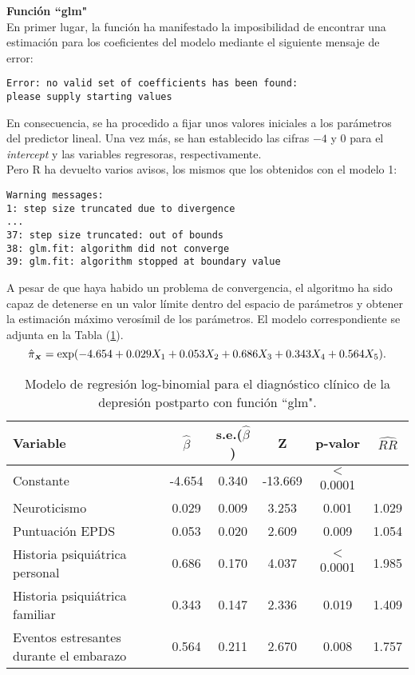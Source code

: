 \textbf{Función ``glm"}\\
[0.3cm]
En primer lugar, la función ha manifestado la imposibilidad de encontrar una estimación para los coeficientes del modelo mediante el siguiente mensaje de error:
\begin{Verbatim}[formatcom=\color{Red},  xleftmargin=2.2cm]
Error: no valid set of coefficients has been found: 
please supply starting values
\end{Verbatim}

En consecuencia, se ha procedido a fijar unos valores iniciales a los parámetros del predictor lineal. Una vez más, se han establecido las cifras $-4$ y $0$ para el \textit{intercept} y las variables regresoras, respectivamente.\\

Pero R ha devuelto varios avisos, los mismos que los obtenidos con el modelo 1:
\begin{Verbatim}[xleftmargin=2.5cm]
Warning messages:
1: step size truncated due to divergence
...
37: step size truncated: out of bounds
38: glm.fit: algorithm did not converge
39: glm.fit: algorithm stopped at boundary value
\end{Verbatim}

A pesar de que haya habido un problema de convergencia, el algoritmo ha sido capaz de detenerse en un valor límite dentro del espacio de parámetros y obtener la estimación máximo verosímil de los parámetros. El modelo correspondiente se adjunta en la Tabla (\ref{tab:15}).
\begin{equation*}
\hat{\pi}_{\mathsmaller{\boldsymbol{X}}}=\exp(-4.654+0.029X_1+0.053X_2+0.686X_3+0.343X_4+0.564X_5).
\end{equation*}

\begin{table} [H]
	\centering
	\begin{tabular}{l c c c c c}
		\toprule
		\textbf{Variable} & $\hat{\beta}$ & s.e.($\hat{\beta}$) & Z & p-valor &$\widehat{RR}$\\
		\midrule
		Constante &   -4.654&  0.340 &-13.669 & $<$ 0.0001  &  \\
		Neuroticismo &  0.029 &  0.009 & 3.253 & 0.001 & 1.029\\
		Puntuación EPDS &  0.053 & 0.020 &  2.609  &0.009& 1.054 \\
		Historia psiquiátrica personal &   0.686  & 0.170&  4.037 &$<$0.0001 &1.985 \\
		Historia psiquiátrica familiar &   0.343  & 0.147 &   2.336  &0.019& 1.409\\
		Eventos estresantes durante el embarazo &  0.564   &0.211 &  2.670 & 0.008 &1.757 \\
		\bottomrule
	\end{tabular}
	\caption{Modelo de regresión log-binomial para el diagnóstico clínico de la depresión postparto con función ``glm".}
	\label{tab:15}
\end{table}


